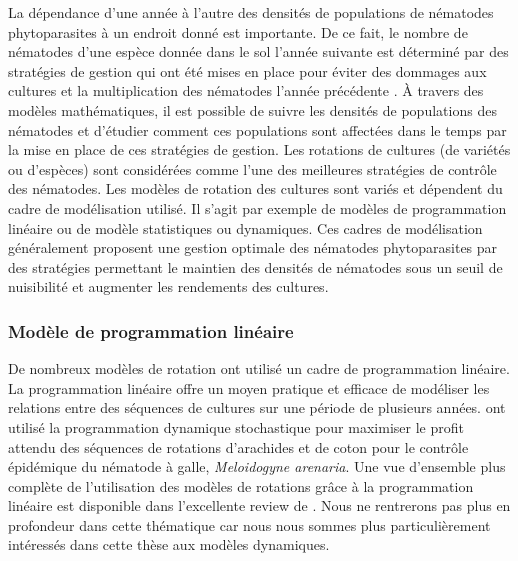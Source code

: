 	 La  dépendance d'une année à l'autre des densités de populations de nématodes phytoparasites  à un endroit donné est importante. De ce fait, le nombre de nématodes d'une espèce donnée  dans le sol l'année suivante est déterminé par des stratégies de gestion qui ont été mises en place  pour éviter des dommages aux cultures et la multiplication des nématodes l'année précédente \citep{Seinhorst1970}.   À travers des modèles mathématiques, il est possible de suivre les densités de populations des nématodes et d'étudier comment ces populations sont affectées dans le temps par la mise en place de ces stratégies de gestion.
Les rotations de cultures (de variétés ou d'espèces) sont considérées comme l'une des meilleures stratégies de contrôle des nématodes. Les modèles de rotation des cultures sont variés et dépendent du cadre de modélisation utilisé. Il s’agit par exemple de modèles de programmation linéaire ou de modèle statistiques ou dynamiques.  Ces cadres de  modélisation généralement proposent une gestion optimale des nématodes phytoparasites par des stratégies permettant le maintien des densités de nématodes sous un seuil de nuisibilité et  augmenter les rendements des cultures.
	
	
\subsubsection{Modèle de programmation linéaire}
	
	 De nombreux modèles de rotation ont utilisé un cadre de programmation linéaire. La programmation linéaire offre un moyen pratique et efficace  de modéliser les relations entre des séquences de cultures sur une période de plusieurs années. \citet{Taylor1999} ont utilisé la programmation dynamique stochastique pour maximiser le profit  attendu des séquences de rotations  d'arachides et de coton pour le contrôle épidémique du nématode à galle, \textit{Meloidogyne  arenaria}. Une vue d'ensemble plus complète de l’utilisation des modèles de rotations grâce à la programmation linéaire est disponible dans l'excellente review de \citep{Dury2012}.  Nous ne rentrerons pas plus en profondeur dans cette thématique car nous nous sommes plus particulièrement intéressés dans cette thèse aux modèles dynamiques.
	
